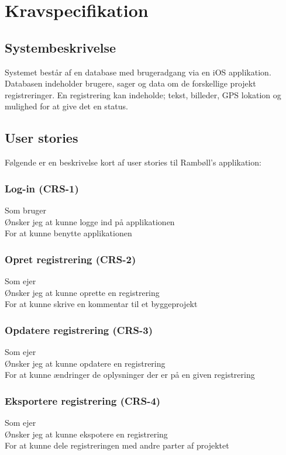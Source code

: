 	\chapter{Kravspecifikation}
	
	\section{Systembeskrivelse}
	Systemet består af en database med brugeradgang via en iOS applikation.
	Databasen indeholder brugere, sager og data om de forskellige projekt registreringer.
	En registrering kan indeholde; tekst, billeder, GPS lokation og mulighed for at give det en status.			
	
	\section{User stories} 
	Følgende er en beskrivelse kort af user stories til Rambøll's applikation:

	\subsection*{Log-in (CRS-1)}
	Som bruger\\
	Ønsker jeg at kunne logge ind på applikationen\\
	For at kunne benytte applikationen
	
	\subsection*{Opret registrering (CRS-2)}
	Som ejer\\
	Ønsker jeg at kunne oprette en registrering\\
	For at kunne skrive en kommentar til et byggeprojekt
	
	\subsection*{Opdatere registrering (CRS-3)}
	Som ejer\\
	Ønsker jeg at kunne opdatere en registrering\\
	For at kunne ændringer de oplysninger der er på en given registrering
	
	\subsection*{Eksportere registrering (CRS-4)}
	Som ejer\\
	Ønsker jeg at kunne ekspotere en registrering\\
	For at kunne dele registreringen med andre parter af projektet
	
